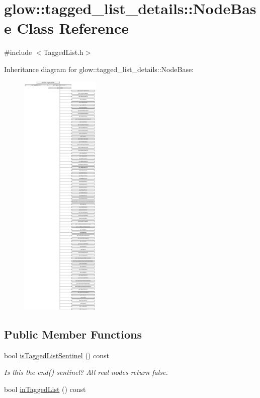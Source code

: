 \hypertarget{classglow_1_1tagged__list__details_1_1_node_base}{}\section{glow\+:\+:tagged\+\_\+list\+\_\+details\+:\+:Node\+Base Class Reference}
\label{classglow_1_1tagged__list__details_1_1_node_base}


{\ttfamily \#include $<$Tagged\+List.\+h$>$}

Inheritance diagram for glow\+:\+:tagged\+\_\+list\+\_\+details\+:\+:Node\+Base\+:\begin{figure}[H]
\begin{center}
\leavevmode
\includegraphics[height=12.000000cm]{classglow_1_1tagged__list__details_1_1_node_base}
\end{center}
\end{figure}
\subsection*{Public Member Functions}
\begin{DoxyCompactItemize}
\item 
\mbox{\label{classglow_1_1tagged__list__details_1_1_node_base_a5d3efe35837b62d4d4400e1f0c8e11c9}} 
bool \hyperlink{classglow_1_1tagged__list__details_1_1_node_base_a5d3efe35837b62d4d4400e1f0c8e11c9}{is\+Tagged\+List\+Sentinel} () const
\begin{DoxyCompactList}\small\item\em Is this the {\ttfamily end()} sentinel? All real nodes return false. \end{DoxyCompactList}\item 
bool \hyperlink{classglow_1_1tagged__list__details_1_1_node_base_af9089de2767fa3a4df48cb6d5b401c6a}{in\+Tagged\+List} () const
\end{DoxyCompactItemize}
